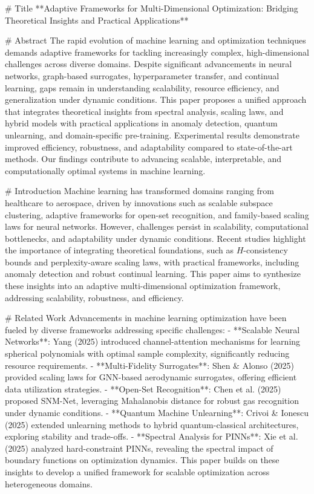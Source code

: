 # Title  
**Adaptive Frameworks for Multi-Dimensional Optimization: Bridging Theoretical Insights and Practical Applications**

# Abstract  
The rapid evolution of machine learning and optimization techniques demands adaptive frameworks for tackling increasingly complex, high-dimensional challenges across diverse domains. Despite significant advancements in neural networks, graph-based surrogates, hyperparameter transfer, and continual learning, gaps remain in understanding scalability, resource efficiency, and generalization under dynamic conditions. This paper proposes a unified approach that integrates theoretical insights from spectral analysis, scaling laws, and hybrid models with practical applications in anomaly detection, quantum unlearning, and domain-specific pre-training. Experimental results demonstrate improved efficiency, robustness, and adaptability compared to state-of-the-art methods. Our findings contribute to advancing scalable, interpretable, and computationally optimal systems in machine learning.

# Introduction  
Machine learning has transformed domains ranging from healthcare to aerospace, driven by innovations such as scalable subspace clustering, adaptive frameworks for open-set recognition, and family-based scaling laws for neural networks. However, challenges persist in scalability, computational bottlenecks, and adaptability under dynamic conditions. Recent studies highlight the importance of integrating theoretical foundations, such as $H$-consistency bounds and perplexity-aware scaling laws, with practical frameworks, including anomaly detection and robust continual learning. This paper aims to synthesize these insights into an adaptive multi-dimensional optimization framework, addressing scalability, robustness, and efficiency.

# Related Work  
Advancements in machine learning optimization have been fueled by diverse frameworks addressing specific challenges:
- **Scalable Neural Networks**: Yang (2025) introduced channel-attention mechanisms for learning spherical polynomials with optimal sample complexity, significantly reducing resource requirements.  
- **Multi-Fidelity Surrogates**: Shen & Alonso (2025) provided scaling laws for GNN-based aerodynamic surrogates, offering efficient data utilization strategies.  
- **Open-Set Recognition**: Chen et al. (2025) proposed SNM-Net, leveraging Mahalanobis distance for robust gas recognition under dynamic conditions.  
- **Quantum Machine Unlearning**: Crivoi & Ionescu (2025) extended unlearning methods to hybrid quantum-classical architectures, exploring stability and trade-offs.  
- **Spectral Analysis for PINNs**: Xie et al. (2025) analyzed hard-constraint PINNs, revealing the spectral impact of boundary functions on optimization dynamics.  
This paper builds on these insights to develop a unified framework for scalable optimization across heterogeneous domains.

